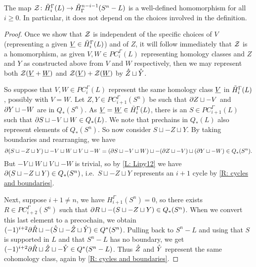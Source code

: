 \begin{proposition}
	The map $\mathcal{Z} \colon \tilde H_i^\Gamma(L) \to \tilde H^{n-i-1}_\Gamma(S^n-L)$ is a well-defined homomorphism for all $i \geq 0$.
	In particular, it does not depend on the choices involved in the definition.
\end{proposition}
\begin{proof}
	Once we show that $\mathcal{Z}$ is independent of the specific choices of $V$ (representing a given $\underline{V} \in \tilde H_i^\Gamma(L)$) and of $Z$, it will follow immediately that $\mathcal{Z}$ is a homomorphism, as given $V,W\in PC_i^\Gamma(L)$ representing homology classes and $Z$ and $Y$ as constructed above from $V$ and $W$ respectively, then we may represent both $\mathcal{Z}(\underline{V} + \underline{W})$ and $\mathcal{Z}(\underline{V}) + \mathcal{Z}(\underline{W})$ by $\mathring{Z} \sqcup \mathring{Y}$.

	So suppose that $V,W \in PC_i^\Gamma(L)$ represent the same homology class $\underline{V}$ in $\tilde H_i^\Gamma(L)$, possibly with $V = W$.
	Let $Z,Y \in PC_{i+1}^\Gamma(S^n)$ be such that $\partial Z \sqcup -V$ and $\partial Y \sqcup -W$ are in $Q_*(S^n)$.
	As $\underline{V}=\underline{W} \in \tilde H_i^\Gamma(L)$, there is an $S \in PC_{i+1}^\Gamma(L)$ such that $\partial S \sqcup -V \sqcup W \in Q_*(L)$.
	We note that prechains in $Q_*(L)$ also represent elements of $Q_*(S^n)$.
	So now consider $S \sqcup -Z \sqcup Y$.
	By taking boundaries and rearranging, we have $$\partial (S \sqcup -Z \sqcup Y)\sqcup -V \sqcup W \sqcup V \sqcup -W = (\partial S \sqcup -V \sqcup W)\sqcup -(\partial Z \sqcup -V) \sqcup (\partial Y\sqcup -W)\in Q_*(S^n).$$
	But $-V \sqcup W \sqcup V \sqcup -W$ is trivial, so by \cref{L: Lipy12} we have $\partial(S \sqcup -Z \sqcup Y)\in Q_*(S^n)$, i.e.\ $S \sqcup -Z \sqcup Y$ represents an $i+1$ cycle by \cref{R: cycles and boundaries}.

	Next, suppose $i+1\neq n$, we have $H_{i+1}^\Gamma(S^n) = 0$, so there exists $R \in PC_{i+2}^\Gamma(S^n)$ such that $\partial R \sqcup -(S \sqcup -Z \sqcup Y) \in Q_*(S^n)$.
	When we convert this last element to a precochain, we obtain $(-1)^{i+2}\partial \hat R \sqcup -(\hat S \sqcup -\hat Z \sqcup \hat Y) \in Q^*(S^n)$.
	Pulling back to $S^n - L$ and using that $S$ is supported in $L$ and that $S^n - L$ has no boundary, we get
	$(-1)^{i+2}\partial \mathring{R} \sqcup \mathring{Z} \sqcup -\mathring{Y} \in Q^*(S^n - L)$.
	Thus $\mathring{Z}$ and $\mathring{Y}$ represent the same cohomology class, again by \cref{R: cycles and boundaries}.


\end{proof}
